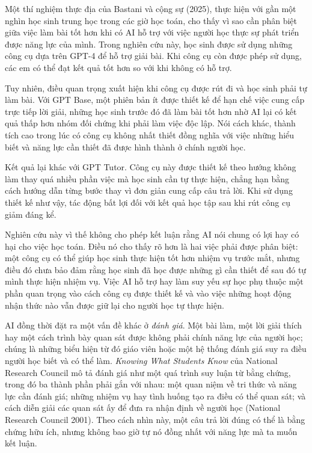 Một thí nghiệm thực địa của Bastani và cộng sự (2025), thực hiện với gần một nghìn học sinh trung học trong các giờ học toán, cho thấy vì sao cần phân biệt giữa việc làm bài tốt hơn khi có AI hỗ trợ với việc người học thực sự phát triển được năng lực của mình. Trong nghiên cứu này, học sinh được sử dụng những công cụ dựa trên GPT-4 để hỗ trợ giải bài. Khi công cụ còn được phép sử dụng, các em có thể đạt kết quả tốt hơn so với khi không có hỗ trợ.

Tuy nhiên, điều quan trọng xuất hiện khi công cụ được rút đi và học sinh phải tự làm bài. Với GPT Base, một phiên bản ít được thiết kế để hạn chế việc cung cấp trực tiếp lời giải, những học sinh trước đó đã làm bài tốt hơn nhờ AI lại có kết quả thấp hơn nhóm đối chứng khi phải làm việc độc lập. Nói cách khác, thành tích cao trong lúc có công cụ không nhất thiết đồng nghĩa với việc những hiểu biết và năng lực cần thiết đã được hình thành ở chính người học.

Kết quả lại khác với GPT Tutor. Công cụ này được thiết kế theo hướng không làm thay quá nhiều phần việc mà học sinh cần tự thực hiện, chẳng hạn bằng cách hướng dẫn từng bước thay vì đơn giản cung cấp câu trả lời. Khi sử dụng thiết kế như vậy, tác động bất lợi đối với kết quả học tập sau khi rút công cụ giảm đáng kể.

Nghiên cứu này vì thế không cho phép kết luận rằng AI nói chung có lợi hay có hại cho việc học toán. Điều nó cho thấy rõ hơn là hai việc phải được phân biệt: một công cụ có thể giúp học sinh thực hiện tốt hơn nhiệm vụ trước mắt, nhưng điều đó chưa bảo đảm rằng học sinh đã học được những gì cần thiết để sau đó tự mình thực hiện nhiệm vụ. Việc AI hỗ trợ hay làm suy yếu sự học phụ thuộc một phần quan trọng vào cách công cụ được thiết kế và vào việc những hoạt động nhận thức nào vẫn được giữ lại cho người học tự thực hiện.

AI đồng thời đặt ra một vấn đề khác ở \emph{đánh giá}. Một bài làm, một lời giải thích hay một cách trình bày quan sát được không phải chính năng lực của người học; chúng là những biểu hiện từ đó giáo viên hoặc một hệ thống đánh giá suy ra điều người học biết và có thể làm. \emph{Knowing What Students Know} của National Research Council mô tả đánh giá như một quá trình suy luận từ bằng chứng, trong đó ba thành phần phải gắn với nhau: một quan niệm về tri thức và năng lực cần đánh giá; những nhiệm vụ hay tình huống tạo ra điều có thể quan sát; và cách diễn giải các quan sát ấy để đưa ra nhận định về người học (National Research Council 2001). Theo cách nhìn này, một câu trả lời đúng có thể là bằng chứng hữu ích, nhưng không bao giờ tự nó đồng nhất với năng lực mà ta muốn kết luận.


